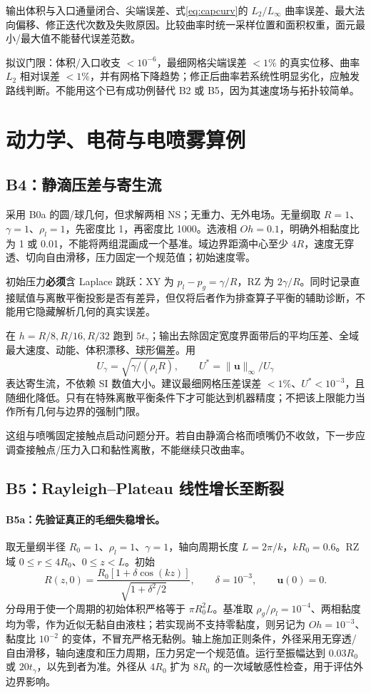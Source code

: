 \documentclass[11pt,a4paper]{article}
\newcommand{\vct}[1]{\boldsymbol{#1}}
\begin{document}
输出体积与入口通量闭合、尖端误差、式\eqref{eq:capcurv}的 $L_2/L_\infty$ 曲率误差、最大法向偏移、修正迭代次数及失败原因。比较曲率时统一采样位置和面积权重，面元最小/最大值不能替代误差范数。

拟议门限：体积/入口收支 $<10^{-6}$，最细网格尖端误差 $<1\%$ 的真实位移、曲率 $L_2$ 相对误差 $<1\%$，并有网格下降趋势；修正后曲率若系统性明显劣化，应触发路线判断。不能用这个已有成功例替代 B2 或 B5，因为其速度场与拓扑较简单。

\clearpage
\section{动力学、电荷与电喷雾算例}
\subsection{B4：静滴压差与寄生流}
采用 B0a 的圆/球几何，但求解两相 NS；无重力、无外电场。无量纲取 $R=1$、$\gamma=1$、$\rho_l=1$，先密度比 1，再密度比 1000。选液相 $Oh=0.1$，明确外相黏度比为 1 或 0.01，不能将两组混画成一个基准。域边界距滴中心至少 $4R$，速度无穿透、切向自由滑移，压力固定一个规范值；初始速度零。

初始压力\textbf{必须}含 Laplace 跳跃：XY 为 $p_l-p_g=\gamma/R$，RZ 为 $2\gamma/R$。同时记录直接赋值与离散平衡投影是否有差异，但仅将后者作为排查算子平衡的辅助诊断，不能用它隐藏解析几何的真实误差。

在 $h=R/8,R/16,R/32$ 跑到 $5t_\gamma$；输出去除固定宽度界面带后的平均压差、全域最大速度、动能、体积漂移、球形偏差。用
\begin{equation}
U_\gamma=\sqrt{\gamma/(\rho_l R)},\qquad
U^*=\|\vct u\|_\infty/U_\gamma
\end{equation}
表达寄生流，不依赖 SI 数值大小。建议最细网格压差误差 $<1\%$、$U^*<10^{-3}$，且随细化降低。只有在特殊离散平衡条件下才可能达到机器精度\cite{popinet2009}；不把该上限能力当作所有几何与边界的强制门限。

这组与喷嘴固定接触点启动问题分开。若自由静滴合格而喷嘴仍不收敛，下一步应调查接触点/压力入口和黏性离散，不能继续只改曲率。

\subsection{B5：Rayleigh--Plateau 线性增长至断裂}
\paragraph{B5a：先验证真正的毛细失稳增长。}
取无量纲半径 $R_0=1$、$\rho_l=1$、$\gamma=1$，轴向周期长度 $L=2\pi/k$，$kR_0=0.6$。RZ 域 $0\leq r\leq4R_0$、$0\leq z<L$。初始
\begin{equation}
R(z,0)=\frac{R_0[1+\delta\cos(kz)]}{\sqrt{1+\delta^2/2}},\qquad
\delta=10^{-3},\qquad\vct u(0)=0.
\end{equation}
分母用于使一个周期的初始体积严格等于 $\pi R_0^2L$。基准取 $\rho_g/\rho_l=10^{-4}$、两相黏度均为零，作为近似无黏自由液柱；若实现尚不支持零黏度，则另记为 $Oh=10^{-3}$、黏度比 $10^{-2}$ 的变体，不冒充严格无黏例。轴上施加正则条件，外径采用无穿透/自由滑移，轴向速度和压力周期，压力另定一个规范值。运行至振幅达到 $0.03R_0$ 或 $20t_\gamma$，以先到者为准。外径从 $4R_0$ 扩为 $8R_0$ 的一次域敏感性检查，用于评估外边界影响。
\end{document}
